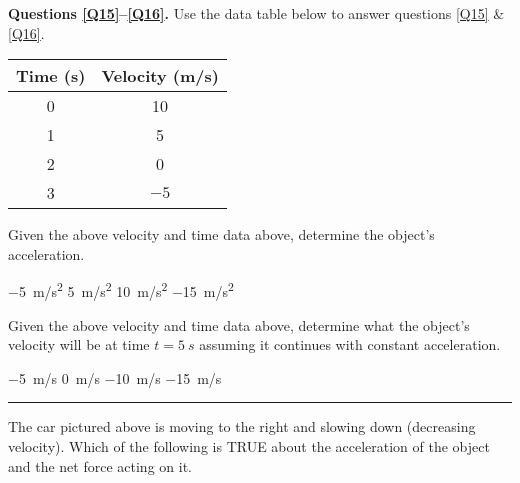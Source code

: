 \documentclass[answers]{exam}
\begin{document}
\begin{questions}
\begin{EnvUplevel}
    \textbf{Questions \ref{Q15}--\ref{Q16}.} Use the data table below to answer questions \ref{Q15} \& \ref{Q16}.
\end{EnvUplevel}

\begin{center}
    \begin{tabular}{|c|c|}
        \hline
        Time (s) & Velocity (m/s) \\ \hline
        0 & 10\\ \hline
        1 & 5\\ \hline
        2 & 0\\ \hline
        3 & $-5$ \\ \hline
    \end{tabular}
\end{center}

\question \label{Q15}
Given the above velocity and time data above, determine the object’s acceleration.

\begin{randomizeoneparchoices}
    \correctchoice \SI{-5}{m/s^2}
    \choice \SI{5}{m/s^2}
    \choice \SI{10}{m/s^2}
    \choice \SI{-15}{m/s^2}    
\end{randomizeoneparchoices}


\question \label{Q16}
Given the above velocity and time data above, determine what the object’s velocity will be at time $t = \SI{5}{s}$ assuming it continues with constant acceleration.

\begin{randomizeoneparchoices}
    \choice \SI{-5}{m/s}
    \choice \SI{0}{m/s}
    \choice \SI{-10}{m/s}
    \correctchoice \SI{-15}{m/s}   
\end{randomizeoneparchoices}

\bigskip
\hrule
\clearpage

\question
\phantom{.}

\begin{center}
\end{center}

The car pictured above is moving to the right and slowing down (decreasing velocity). Which of the following is TRUE about the acceleration of the object and the net force acting on it.


\end{questions}
\end{document}
